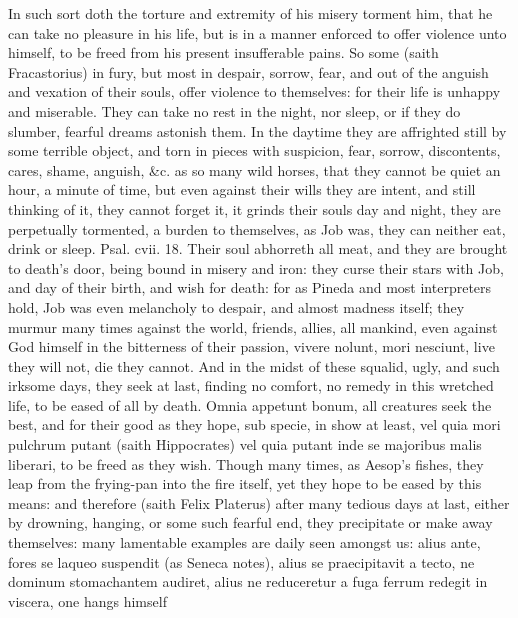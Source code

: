 In such sort doth the torture and extremity of his misery torment him,
that he can take no pleasure in his life, but is in a manner enforced
to offer violence unto himself, to be freed from his present
insufferable pains. So some (saith Fracastorius) in fury, but
most in despair, sorrow, fear, and out of the anguish and vexation of
their souls, offer violence to themselves: for their life is unhappy
and miserable. They can take no rest in the night, nor sleep, or if
they do slumber, fearful dreams astonish them. In the daytime they are
affrighted still by some terrible object, and torn in pieces with
suspicion, fear, sorrow, discontents, cares, shame, anguish, \&c. as so
many wild horses, that they cannot be quiet an hour, a minute of time,
but even against their wills they are intent, and still thinking of it,
they cannot forget it, it grinds their souls day and night, they are
perpetually tormented, a burden to themselves, as Job was, they can
neither eat, drink or sleep. Psal. cvii. 18. Their soul abhorreth all
meat, and they are brought to death's door, being bound in misery
and iron: they curse their stars with Job, and day of their
birth, and wish for death: for as Pineda and most interpreters hold,
Job was even melancholy to despair, and almost madness itself;
they murmur many times against the world, friends, allies, all mankind,
even against God himself in the bitterness of their passion,
vivere nolunt, mori nesciunt, live they will not, die they
cannot. And in the midst of these squalid, ugly, and such irksome days,
they seek at last, finding no comfort, no remedy in this wretched
life, to be eased of all by death. Omnia appetunt bonum, all creatures
seek the best, and for their good as they hope, sub specie, in show at
least, vel quia mori pulchrum putant (saith Hippocrates) vel quia
putant inde se majoribus malis liberari, to be freed as they wish.
Though many times, as Aesop's fishes, they leap from the frying-pan
into the fire itself, yet they hope to be eased by this means: and
therefore (saith Felix Platerus) after many tedious days at last,
either by drowning, hanging, or some such fearful end, they precipitate
or make away themselves: many lamentable examples are daily seen
amongst us: alius ante, fores se laqueo suspendit (as Seneca notes),
alius se praecipitavit a tecto, ne dominum stomachantem audiret, alius
ne reduceretur a fuga ferrum redegit in viscera, one hangs himself
